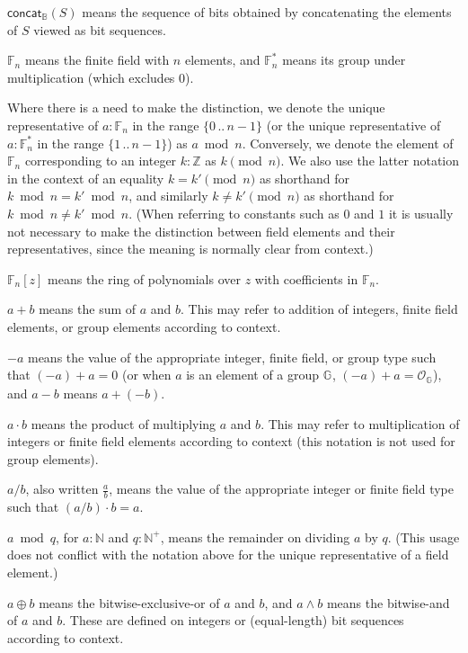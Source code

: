 \documentclass{article}
\newcommand{\typecolon}{:}
\newcommand{\bit}{\mathbb{B}}
\newcommand{\Nat}{\mathbb{N}}
\newcommand{\PosInt}{\mathbb{N}^+}
\newcommand{\Int}{\mathbb{Z}}
\newcommand{\Field}[1]{\mathbb{F}_{\!#1}}
\newcommand{\Fieldstar}[1]{\mathbb{F}^\ast_{#1}}
\newcommand{\concatbits}{\mathsf{concat}_\bit}
\newcommand{\setof}[1]{\{{#1}\}}
\newcommand{\barerange}[2]{{{#1}\,..\,{#2}}}
\newcommand{\range}[2]{\setof{\barerange{#1}{#2}}}
\newcommand{\xor}{\oplus}
\newcommand{\mult}{\cdot}
\newcommand{\Zero}{\mathcal{O}}
\newcommand{\GroupG}[1]{\mathbb{G}_{#1}}
\newcommand{\ZeroG}[1]{\Zero_{\GroupG{#1}}}
\begin{document}
$\concatbits(S)$ means the sequence of bits obtained by
concatenating the elements of $S$ viewed as bit sequences.

$\Field{n}$ means the finite field with $n$ elements, and
$\Fieldstar{n}$ means its group under multiplication (which excludes $0$).

Where there is a need to make the distinction, we denote the unique
representative of $a \typecolon \Field{n}$ in the range $\range{0}{n-1}$
(or the unique representative of $a \typecolon \Fieldstar{n}$ in the range
$\range{1}{n-1}$) as $a \bmod n$. Conversely, we denote the element
of $\Field{n}$ corresponding to an integer $k \typecolon \Int$
as $k \pmod{n}$. We also use the latter notation in the context of
an equality $k = k' \pmod{n}$ as shorthand for $k \bmod n = k' \bmod n$,
and similarly $k \neq k' \pmod{n}$ as shorthand for $k \bmod n \neq k' \bmod n$.
(When referring to constants such as $0$ and $1$ it is usually not
necessary to make the distinction between field elements and their
representatives, since the meaning is normally clear from context.)

$\Field{n}[z]$ means the ring of polynomials over $z$ with coefficients
in $\Field{n}$.

$a + b$ means the sum of $a$ and $b$. This may refer to addition of
integers, finite field elements, or group elements according to context.

$-a$ means the value of the appropriate integer, finite field, or group type
such that $(-a) + a = 0$ (or when $a$ is an element of a group $\GroupG{}$,
$(-a) + a = \ZeroG{}$), and $a - b$ means $a + (-b)$.

$a \mult b$ means the product of multiplying $a$ and $b$. This may refer to
multiplication of integers or finite field elements according to context
(this notation is not used for group elements).

$a / b$, also written $\frac{a}{b}$, means the value of the appropriate
integer or finite field type such that $(a / b) \mult b = a$.

$a \bmod q$, for $a \typecolon \Nat$ and $q \typecolon \PosInt$,
means the remainder on dividing $a$ by $q$. (This usage does not
conflict with the notation above for the unique representative of
a field element.)

$a \xor b$ means the bitwise-exclusive-or of $a$ and $b$,
and $a \land b$ means the bitwise-and of $a$ and $b$. These are
defined on integers or (equal-length) bit sequences according to context.
\end{document}
